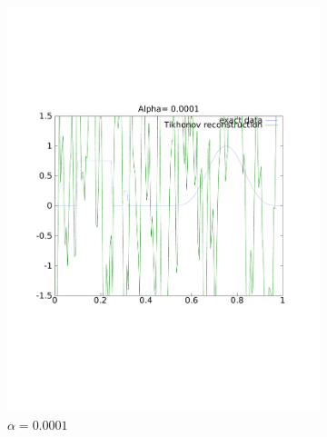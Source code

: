 \documentclass{article}
\begin{document}
\begin{figure}[!htb]
        \centering
        \begin{subfigure}[bh]{0.45\textwidth}
                \includegraphics[width=\textwidth]{plots/reconstruct0001.pdf}
                \caption{$\alpha=0.0001$}
        \end{subfigure}%
        \begin{subfigure}[bh]{0.45\textwidth}

\end{subfigure}
\end{figure}
\end{document}
